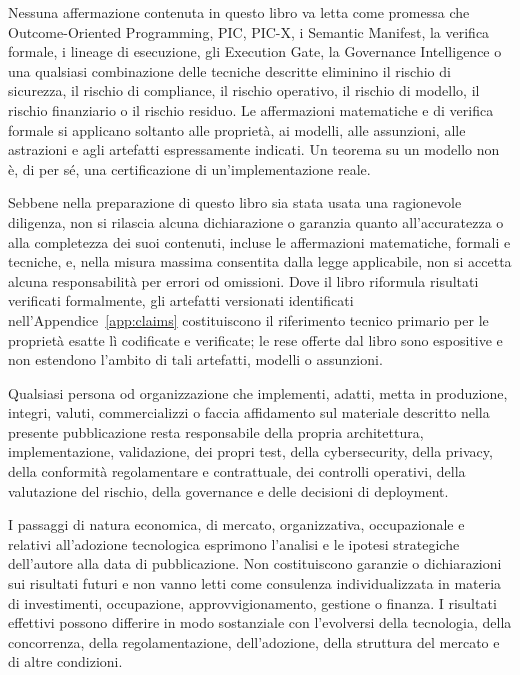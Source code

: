 \documentclass[10pt,oneside,openany]{book}
\begin{document}
Nessuna affermazione contenuta in questo libro va letta come promessa che Outcome-Oriented Programming, PIC, PIC-X, i Semantic Manifest, la verifica formale, i lineage di esecuzione, gli Execution Gate, la Governance Intelligence o una qualsiasi combinazione delle tecniche descritte eliminino il rischio di sicurezza, il rischio di compliance, il rischio operativo, il rischio di modello, il rischio finanziario o il rischio residuo. Le affermazioni matematiche e di verifica formale si applicano soltanto alle proprietà, ai modelli, alle assunzioni, alle astrazioni e agli artefatti espressamente indicati. Un teorema su un modello non è, di per sé, una certificazione di un'implementazione reale.

Sebbene nella preparazione di questo libro sia stata usata una ragionevole diligenza, non si rilascia alcuna dichiarazione o garanzia quanto all'accuratezza o alla completezza dei suoi contenuti, incluse le affermazioni matematiche, formali e tecniche, e, nella misura massima consentita dalla legge applicabile, non si accetta alcuna responsabilità per errori od omissioni. Dove il libro riformula risultati verificati formalmente, gli artefatti versionati identificati nell'Appendice~\ref{app:claims} costituiscono il riferimento tecnico primario per le proprietà esatte lì codificate e verificate; le rese offerte dal libro sono espositive e non estendono l'ambito di tali artefatti, modelli o assunzioni.

Qualsiasi persona od organizzazione che implementi, adatti, metta in produzione, integri, valuti, commercializzi o faccia affidamento sul materiale descritto nella presente pubblicazione resta responsabile della propria architettura, implementazione, validazione, dei propri test, della cybersecurity, della privacy, della conformità regolamentare e contrattuale, dei controlli operativi, della valutazione del rischio, della governance e delle decisioni di deployment.

I passaggi di natura economica, di mercato, organizzativa, occupazionale e relativi all'adozione tecnologica esprimono l'analisi e le ipotesi strategiche dell'autore alla data di pubblicazione. Non costituiscono garanzie o dichiarazioni sui risultati futuri e non vanno letti come consulenza individualizzata in materia di investimenti, occupazione, approvvigionamento, gestione o finanza. I risultati effettivi possono differire in modo sostanziale con l'evolversi della tecnologia, della concorrenza, della regolamentazione, dell'adozione, della struttura del mercato e di altre condizioni.
\end{document}
